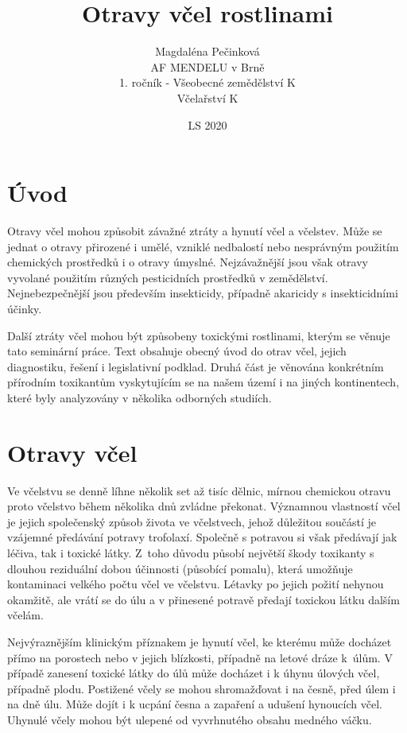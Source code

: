 \documentclass[openany, oneside, a4paper, 12pt, final]{memoir}
\title{Otravy včel rostlinami}
\author{Magdaléna Pečinková\\ AF MENDELU v Brně\\ 1. ročník - Všeobecné zemědělství K \\ Včelařství K}
\date{LS 2020}
\begin{document}
\frontmatter
\pagestyle{empty}
\maketitle
\clearpage
\tableofcontents
\mainmatter
\chapter*{Úvod}
\label{chap:intro}
Otravy včel mohou způsobit závažné ztráty a hynutí včel a včelstev. Může se jednat o otravy přirozené i umělé, vzniklé nedbalostí nebo nesprávným použitím chemických prostředků i o otravy úmyslné. Nejzávažnější jsou však otravy vyvolané použitím různých pesticidních prostředků v zemědělství. Nejnebezpečnější jsou především insekticidy, případně akaricidy s insekticidními účinky.  \cite{Multimedpomucka, vcelarstviVeselý, svobodovaveterinarni} 

Další ztráty včel mohou být způsobeny toxickými rostlinami, kterým se věnuje tato seminární práce. Text obsahuje obecný úvod do otrav včel, jejich diagnostiku, řešení i legislativní podklad. Druhá část je věnována konkrétním přírodním toxikantům vyskytujícím se na našem území i na jiných kontinentech, které byly analyzovány v několika odborných studiích.

\chapter{Otravy včel}
Ve včelstvu se denně líhne několik set až tisíc dělnic, mírnou chemickou otravu proto včelstvo během několika dnů zvládne překonat. Významnou vlastností včel je jejich společenský způsob života ve včelstvech, jehož důležitou součástí je vzájemné předávání potravy trofolaxí. Společně s potravou si však předávají jak léčiva, tak i toxické látky. Z~toho důvodu působí největší škody toxikanty s dlouhou reziduální dobou účinnosti (působící pomalu), která umožňuje kontaminaci velkého počtu včel ve včelstvu. Létavky po jejich požití nehynou okamžitě, ale vrátí se do úlu a v přinesené potravě předají toxickou látku dalším včelám. \cite{vcelarstviVeselý, svobodovaveterinarni}

Nejvýraznějším klinickým příznakem je hynutí včel, ke kterému může docházet přímo na porostech nebo v jejich blízkosti, případně na letové dráze k~úlům. V případě zanesení toxické látky do úlů může docházet i k úhynu úlových včel, případně plodu. Postižené včely se mohou shromažďovat i na česně, před úlem i na dně úlu. Může dojít i k ucpání česna a zapaření a udušení hynoucích včel. Uhynulé včely mohou být ulepené od vyvrhnutého obsahu medného váčku.
\end{document}
